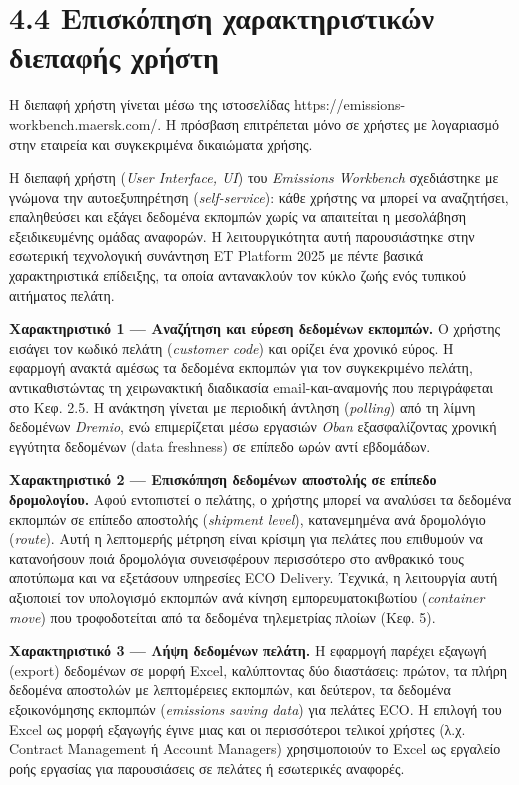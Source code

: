 \documentclass[11pt,a4paper,greek,twoside]{template-xe}
\begin{document}
\section{4.4 Επισκόπηση χαρακτηριστικών διεπαφής
χρήστη}\label{ux3b5ux3c0ux3b9ux3c3ux3baux3ccux3c0ux3b7ux3c3ux3b7-ux3c7ux3b1ux3c1ux3b1ux3baux3c4ux3b7ux3c1ux3b9ux3c3ux3c4ux3b9ux3baux3ceux3bd-ux3b4ux3b9ux3b5ux3c0ux3b1ux3c6ux3aeux3c2-ux3c7ux3c1ux3aeux3c3ux3c4ux3b7}

Η διεπαφή χρήστη γίνεται μέσω της ιστοσελίδας
https://emissions-workbench.maersk.com/. Η πρόσβαση επιτρέπεται μόνο σε
χρήστες με λογαριασμό στην εταιρεία και συγκεκριμένα δικαιώματα χρήσης.

Η διεπαφή χρήστη (\emph{User Interface, UI}) του \emph{Emissions
Workbench} σχεδιάστηκε με γνώμονα την αυτοεξυπηρέτηση
(\emph{self-service}): κάθε χρήστης να μπορεί να αναζητήσει, επαληθεύσει
και εξάγει δεδομένα εκπομπών χωρίς να απαιτείται η μεσολάβηση
εξειδικευμένης ομάδας αναφορών. Η λειτουργικότητα αυτή παρουσιάστηκε
στην εσωτερική τεχνολογική συνάντηση ET Platform 2025 με πέντε βασικά
χαρακτηριστικά επίδειξης, τα οποία αντανακλούν τον κύκλο ζωής ενός
τυπικού αιτήματος πελάτη.

\textbf{Χαρακτηριστικό 1 --- Αναζήτηση και εύρεση δεδομένων εκπομπών.} Ο
χρήστης εισάγει τον κωδικό πελάτη (\emph{customer code}) και ορίζει ένα
χρονικό εύρος. Η εφαρμογή ανακτά αμέσως τα δεδομένα εκπομπών για τον
συγκεκριμένο πελάτη, αντικαθιστώντας τη χειρωνακτική διαδικασία
email-και-αναμονής που περιγράφεται στο Κεφ. 2.5. Η ανάκτηση γίνεται με
περιοδική άντληση (\emph{polling}) από τη λίμνη δεδομένων \emph{Dremio},
ενώ επιμερίζεται μέσω εργασιών \emph{Oban} εξασφαλίζοντας χρονική
εγγύτητα δεδομένων (data freshness) σε επίπεδο ωρών αντί εβδομάδων.

\textbf{Χαρακτηριστικό 2 --- Επισκόπηση δεδομένων αποστολής σε επίπεδο
δρομολογίου.} Αφού εντοπιστεί ο πελάτης, ο χρήστης μπορεί να αναλύσει τα
δεδομένα εκπομπών σε επίπεδο αποστολής (\emph{shipment level}),
κατανεμημένα ανά δρομολόγιο (\emph{route}). Αυτή η λεπτομερής μέτρηση
είναι κρίσιμη για πελάτες που επιθυμούν να κατανοήσουν ποιά δρομολόγια
συνεισφέρουν περισσότερο στο ανθρακικό τους αποτύπωμα και να εξετάσουν
υπηρεσίες ECO Delivery. Τεχνικά, η λειτουργία αυτή αξιοποιεί τον
υπολογισμό εκπομπών ανά κίνηση εμπορευματοκιβωτίου (\emph{container
move}) που τροφοδοτείται από τα δεδομένα τηλεμετρίας πλοίων (Κεφ. 5).

\textbf{Χαρακτηριστικό 3 --- Λήψη δεδομένων πελάτη.} Η εφαρμογή παρέχει
εξαγωγή (export) δεδομένων σε μορφή Excel, καλύπτοντας δύο διαστάσεις:
πρώτον, τα πλήρη δεδομένα αποστολών με λεπτομέρειες εκπομπών, και
δεύτερον, τα δεδομένα εξοικονόμησης εκπομπών (\emph{emissions saving
data}) για πελάτες ECO. Η επιλογή του Excel ως μορφή εξαγωγής έγινε μιας
και οι περισσότεροι τελικοί χρήστες (λ.χ. Contract Management ή Account
Managers) χρησιμοποιούν το Excel ως εργαλείο ροής εργασίας για
παρουσιάσεις σε πελάτες ή εσωτερικές αναφορές.
\end{document}
